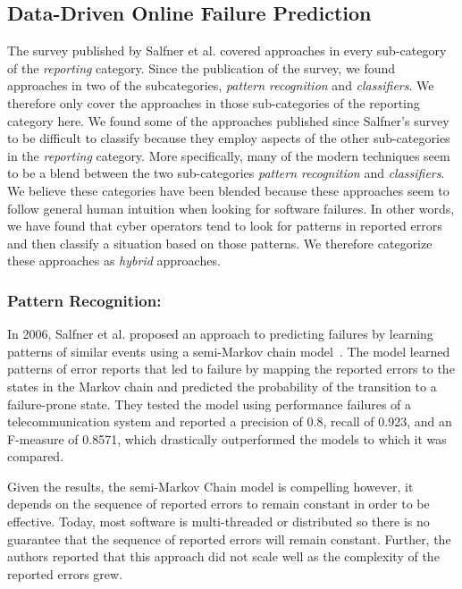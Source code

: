 \subsection{Data-Driven Online Failure Prediction}
The survey published by Salfner et al. covered approaches in every sub-category of the \emph{reporting} category.  Since the publication of the survey, we found approaches in two of the subcategories, \emph{pattern recognition} and \emph{classifiers}.  We therefore only cover the approaches in those sub-categories of the reporting category here.  We found some of the approaches published since Salfner's survey to be difficult to classify because they employ aspects of the other sub-categories in the \emph{reporting} category.  More specifically, many of the modern techniques seem to be a blend between the two sub-categories \emph{pattern recognition} and \emph{classifiers}.  We believe these categories have been blended because these approaches seem to follow general human intuition when looking for software failures.  In other words, we have found that cyber operators tend to look for patterns in reported errors and then classify a situation based on those patterns.  We therefore categorize these approaches as \emph{hybrid} approaches.

\subsubsection{Pattern Recognition:}
In 2006, Salfner et al. proposed an approach to predicting failures by learning patterns of similar events using a semi-Markov chain model~\cite{salfner2006}.  The model learned patterns of error reports that led to failure by mapping the reported errors to the states in the Markov chain and predicted the probability of the transition to a failure-prone state.  They tested the model using performance failures of a telecommunication system and reported a precision of 0.8, recall of 0.923, and an F-measure of 0.8571, which drastically outperformed the models to which it was compared.

Given the results, the semi-Markov Chain model is compelling however, it depends on the sequence of reported errors to remain constant in order to be effective.  Today, most software is multi-threaded or distributed so there is no guarantee that the sequence of reported errors will remain constant.  Further, the authors reported that this approach did not scale well as the complexity of the reported errors grew.


